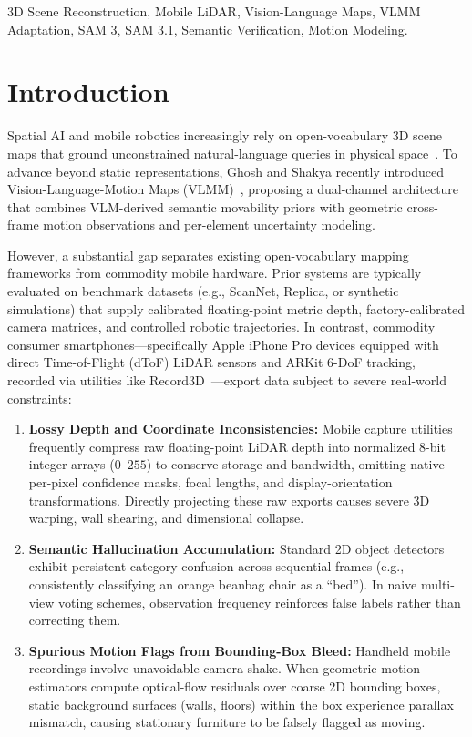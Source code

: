\documentclass[conference]{IEEEtran}
\begin{document}
\begin{IEEEkeywords}
3D Scene Reconstruction, Mobile LiDAR, Vision-Language Maps, VLMM Adaptation, SAM 3, SAM 3.1, Semantic Verification, Motion Modeling.
\end{IEEEkeywords}

\section{Introduction}
Spatial AI and mobile robotics increasingly rely on open-vocabulary 3D scene maps that ground unconstrained natural-language queries in physical space~\cite{radford2021clip, huang2023vlmaps, jatavallabhula2023conceptfusion}. To advance beyond static representations, Ghosh and Shakya recently introduced Vision-Language-Motion Maps (VLMM)~\cite{vlmm2026}, proposing a dual-channel architecture that combines VLM-derived semantic movability priors with geometric cross-frame motion observations and per-element uncertainty modeling.

However, a substantial gap separates existing open-vocabulary mapping frameworks from commodity mobile hardware. Prior systems are typically evaluated on benchmark datasets (e.g., ScanNet, Replica, or synthetic simulations) that supply calibrated floating-point metric depth, factory-calibrated camera matrices, and controlled robotic trajectories. In contrast, commodity consumer smartphones---specifically Apple iPhone Pro devices equipped with direct Time-of-Flight (dToF) LiDAR sensors and ARKit 6-DoF tracking, recorded via utilities like Record3D~\cite{apple2020arkit}---export data subject to severe real-world constraints:
\begin{enumerate}\setlength{\itemsep}{1.5pt}\setlength{\parskip}{0pt}
    \item \textbf{Lossy Depth and Coordinate Inconsistencies:} Mobile capture utilities frequently compress raw floating-point LiDAR depth into normalized 8-bit integer arrays ($0$--$255$) to conserve storage and bandwidth, omitting native per-pixel confidence masks, focal lengths, and display-orientation transformations. Directly projecting these raw exports causes severe 3D warping, wall shearing, and dimensional collapse.
    \item \textbf{Semantic Hallucination Accumulation:} Standard 2D object detectors exhibit persistent category confusion across sequential frames (e.g., consistently classifying an orange beanbag chair as a ``bed''). In naive multi-view voting schemes, observation frequency reinforces false labels rather than correcting them.
    \item \textbf{Spurious Motion Flags from Bounding-Box Bleed:} Handheld mobile recordings involve unavoidable camera shake. When geometric motion estimators compute optical-flow residuals over coarse 2D bounding boxes, static background surfaces (walls, floors) within the box experience parallax mismatch, causing stationary furniture to be falsely flagged as moving.
\end{enumerate}
\end{document}
